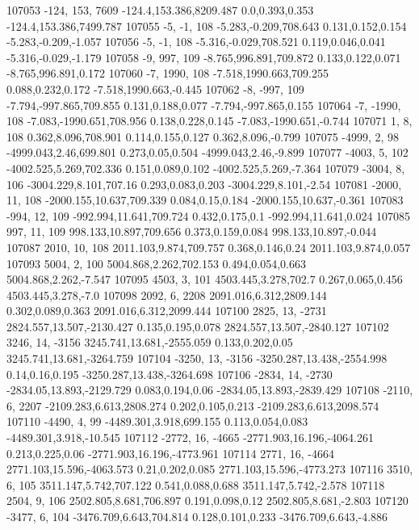 107053	-124, 153, 7609	-124.4,153.386,8209.487	0.0,0.393,0.353	-124.4,153.386,7499.787
107055	-5, -1, 108	-5.283,-0.209,708.643	0.131,0.152,0.154	-5.283,-0.209,-1.057
107056	-5, -1, 108	-5.316,-0.029,708.521	0.119,0.046,0.041	-5.316,-0.029,-1.179
107058	-9, 997, 109	-8.765,996.891,709.872	0.133,0.122,0.071	-8.765,996.891,0.172
107060	-7, 1990, 108	-7.518,1990.663,709.255	0.088,0.232,0.172	-7.518,1990.663,-0.445
107062	-8, -997, 109	-7.794,-997.865,709.855	0.131,0.188,0.077	-7.794,-997.865,0.155
107064	-7, -1990, 108	-7.083,-1990.651,708.956	0.138,0.228,0.145	-7.083,-1990.651,-0.744
107071	1, 8, 108	0.362,8.096,708.901	0.114,0.155,0.127	0.362,8.096,-0.799
107075	-4999, 2, 98	-4999.043,2.46,699.801	0.273,0.05,0.504	-4999.043,2.46,-9.899
107077	-4003, 5, 102	-4002.525,5.269,702.336	0.151,0.089,0.102	-4002.525,5.269,-7.364
107079	-3004, 8, 106	-3004.229,8.101,707.16	0.293,0.083,0.203	-3004.229,8.101,-2.54
107081	-2000, 11, 108	-2000.155,10.637,709.339	0.084,0.15,0.184	-2000.155,10.637,-0.361
107083	-994, 12, 109	-992.994,11.641,709.724	0.432,0.175,0.1	-992.994,11.641,0.024
107085	997, 11, 109	998.133,10.897,709.656	0.373,0.159,0.084	998.133,10.897,-0.044
107087	2010, 10, 108	2011.103,9.874,709.757	0.368,0.146,0.24	2011.103,9.874,0.057
107093	5004, 2, 100	5004.868,2.262,702.153	0.494,0.054,0.663	5004.868,2.262,-7.547
107095	4503, 3, 101	4503.445,3.278,702.7	0.267,0.065,0.456	4503.445,3.278,-7.0
107098	2092, 6, 2208	2091.016,6.312,2809.144	0.302,0.089,0.363	2091.016,6.312,2099.444
107100	2825, 13, -2731	2824.557,13.507,-2130.427	0.135,0.195,0.078	2824.557,13.507,-2840.127
107102	3246, 14, -3156	3245.741,13.681,-2555.059	0.133,0.202,0.05	3245.741,13.681,-3264.759
107104	-3250, 13, -3156	-3250.287,13.438,-2554.998	0.14,0.16,0.195	-3250.287,13.438,-3264.698
107106	-2834, 14, -2730	-2834.05,13.893,-2129.729	0.083,0.194,0.06	-2834.05,13.893,-2839.429
107108	-2110, 6, 2207	-2109.283,6.613,2808.274	0.202,0.105,0.213	-2109.283,6.613,2098.574
107110	-4490, 4, 99	-4489.301,3.918,699.155	0.113,0.054,0.083	-4489.301,3.918,-10.545
107112	-2772, 16, -4665	-2771.903,16.196,-4064.261	0.213,0.225,0.06	-2771.903,16.196,-4773.961
107114	2771, 16, -4664	2771.103,15.596,-4063.573	0.21,0.202,0.085	2771.103,15.596,-4773.273
107116	3510, 6, 105	3511.147,5.742,707.122	0.541,0.088,0.688	3511.147,5.742,-2.578
107118	2504, 9, 106	2502.805,8.681,706.897	0.191,0.098,0.12	2502.805,8.681,-2.803
107120	-3477, 6, 104	-3476.709,6.643,704.814	0.128,0.101,0.233	-3476.709,6.643,-4.886